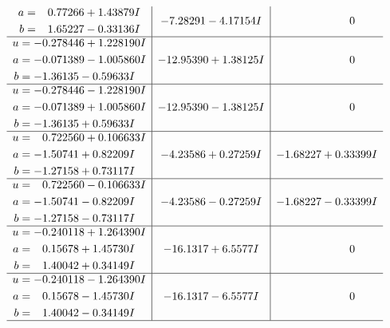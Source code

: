 \documentclass[1p]{elsarticle_modified}
\theoremstyle{definition}
\begin{document}
$$\begin{array}{c|c|c}
\begin{aligned}
a &= \phantom{-}0.77266 + 1.43879 I \\
b &= \phantom{-}1.65227 - 0.33136 I\end{aligned}
 & -7.28291 - 4.17154 I & \phantom{-0.000000 } 0 \\ \hline\begin{aligned}
u &= -0.278446 + 1.228190 I \\
a &= -0.071389 - 1.005860 I \\
b &= -1.36135 - 0.59633 I\end{aligned}
 & -12.95390 + 1.38125 I & \phantom{-0.000000 } 0 \\ \hline\begin{aligned}
u &= -0.278446 - 1.228190 I \\
a &= -0.071389 + 1.005860 I \\
b &= -1.36135 + 0.59633 I\end{aligned}
 & -12.95390 - 1.38125 I & \phantom{-0.000000 } 0 \\ \hline\begin{aligned}
u &= \phantom{-}0.722560 + 0.106633 I \\
a &= -1.50741 + 0.82209 I \\
b &= -1.27158 + 0.73117 I\end{aligned}
 & -4.23586 + 0.27259 I & -1.68227 + 0.33399 I \\ \hline\begin{aligned}
u &= \phantom{-}0.722560 - 0.106633 I \\
a &= -1.50741 - 0.82209 I \\
b &= -1.27158 - 0.73117 I\end{aligned}
 & -4.23586 - 0.27259 I & -1.68227 - 0.33399 I \\ \hline\begin{aligned}
u &= -0.240118 + 1.264390 I \\
a &= \phantom{-}0.15678 + 1.45730 I \\
b &= \phantom{-}1.40042 + 0.34149 I\end{aligned}
 & -16.1317 + 6.5577 I & \phantom{-0.000000 } 0 \\ \hline\begin{aligned}
u &= -0.240118 - 1.264390 I \\
a &= \phantom{-}0.15678 - 1.45730 I \\
b &= \phantom{-}1.40042 - 0.34149 I\end{aligned}
 & -16.1317 - 6.5577 I & \phantom{-0.000000 } 0\\
 \hline 
 \end{array}$$\newpage$$\begin{array}{c|c|c}  

\end{array}$$
\end{document}
